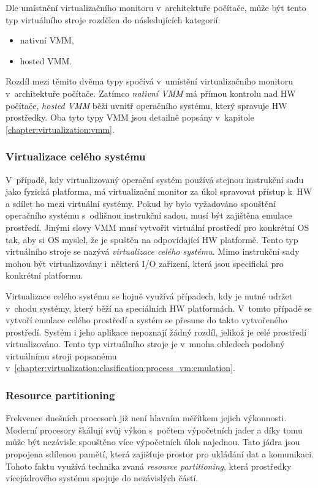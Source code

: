 Dle umístnění virtualizačního monitoru v~architektuře počítače, může být tento typ virtuálního stroje rozdělen do následujících kategorií:  
\begin{itemize}
  \item nativní VMM,
  \item hosted VMM.
\end{itemize}
Rozdíl mezi těmito dvěma typy spočívá v~umístění virtualizačního monitoru v~architektuře počítače. Zatímco 
\textit{nativní VMM} má přímou kontrolu nad HW počítače, \textit{hosted VMM} běží uvnitř operačního systému, který spravuje
HW prostředky. Oba tyto typy VMM jsou detailně popsány v~kapitole \ref{chapter:virtualization:vmm}.   
\subsubsection{Virtualizace celého systému}
\label{chapter:virtualization:clasification:system_vm:whole_system_virtualization}
V~případě, kdy virtualizovaný operační systém používá stejnou instrukční sadu jako fyzická platforma, má virtualizační monitor
za úkol spravovat přístup k~HW a sdílet ho mezi virtuální systémy. Pokud by bylo vyžadováno spouštění operačního systému
s~odlišnou instrukční sadou, musí být zajištěna emulace prostředí. Jinými slovy VMM musí vytvořit virtuální prostředí pro
konkrétní OS tak, aby si OS myslel, že je spuštěn na odpovídající HW platformě. Tento typ virtuálního stroje se nazývá
\textit{virtualizace celého systému}. Mimo instrukční sady mohou být virtualizovány i~některá I/O zařízení, která jsou
specifická pro konkrétní platformu.

Virtualizace celého systému se hojně využívá případech, kdy je nutné udržet v~chodu systémy, který běží na speciálních HW platformách.
V~tomto případě se vytvoří emulace celého prostředí a systém se přesune do takto vytvořeného prostředí. Systém i jeho aplikace
nepoznají žádný rozdíl, jelikož je celé prostředí virtualizováno. Tento typ virtuálního stroje je v~mnoha ohledech podobný
virtuálnímu stroji popsanému v~\ref{chapter:virtualization:clasification:process_vm:emulation}.
\subsubsection{Resource partitioning}
\label{chapter:virtualization:clasification:system_vm:partitioning}
Frekvence dnešních procesorů již není hlavním měřítkem jejich výkonnosti. Moderní procesory škálují svůj
výkon s~počtem výpočetních jader a díky tomu může být nezávisle spouštěno více výpočetních úloh najednou. Tato jádra jsou 
propojena sdílenou pamětí, která zajišťuje prostor pro ukládání dat a komunikaci. Tohoto faktu využívá technika zvaná 
\textit{resource partitioning}, která prostředky vícejádrového systému spojuje do nezávislých částí.

